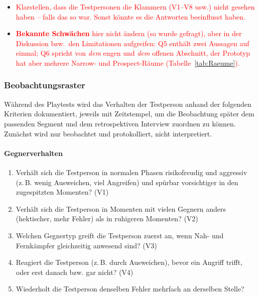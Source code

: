 \documentclass[../Main.tex]{subfiles}
\begin{document}
\begin{itemize}[leftmargin=1.5cm]
    \item \textcolor{red}{Klarstellen, dass die Testpersonen die Klammern (V1--V8 usw.) nicht gesehen haben -- falls das so war. Sonst könnte es die Antworten beeinflusst haben.}
    \item \textcolor{red}{\textbf{Bekannte Schwächen} hier nicht ändern (so wurde gefragt), aber in der Diskussion bzw.\ den Limitationen aufgreifen: Q5 enthält zwei Aussagen auf einmal; Q6 spricht von \emph{dem} engen und \emph{dem} offenen Abschnitt, der Prototyp hat aber mehrere Narrow- und Prospect-Räume (Tabelle~\ref{tab:Raeume}).}
\end{itemize}

\subsubsection{Beobachtungsraster} \label{sec:Beobachtungsraster}

Während des Playtests wird das Verhalten der Testperson anhand der folgenden Kriterien dokumentiert, jeweils mit Zeitstempel, um die Beobachtung später dem passenden Segment und dem retrospektiven Interview zuordnen zu können. Zunächst wird nur beobachtet und protokolliert, nicht interpretiert.

\paragraph{Gegnerverhalten}
\begin{enumerate}[label=\textbf{B\arabic*}, leftmargin=1.5cm, itemsep=0.5em]
    \item Verhält sich die Testperson in normalen Phasen risikofreudig und aggressiv (z.\,B. wenig Ausweichen, viel Angreifen) und spürbar vorsichtiger in den zugespitzten Momenten? \hfill (V1)
    \item Verhält sich die Testperson in Momenten mit vielen Gegnern anders (hektischer, mehr Fehler) als in ruhigeren Momenten? \hfill (V2)
    \item Welchen Gegnertyp greift die Testperson zuerst an, wenn Nah- und Fernkämpfer gleichzeitig anwesend sind? \hfill (V3)
    \item Reagiert die Testperson (z.\,B. durch Ausweichen), bevor ein Angriff trifft, oder erst danach bzw. gar nicht? \hfill (V4)
    \item Wiederholt die Testperson denselben Fehler mehrfach an derselben Stelle?
\end{enumerate}
\end{document}
